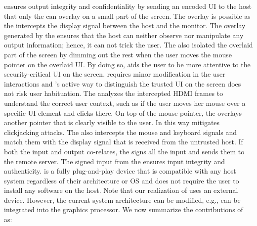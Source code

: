 \name ensures output integrity and confidentiality by sending an encoded UI to the host that only the \device can overlay on a small part of the screen. The overlay is possible as the \device intercepts the display signal between the host and the monitor. The overlay generated by the \device ensures that the host can neither observe nor manipulate any output information; hence, it can not trick the user. The \device also isolated the overlaid part of the screen by dimming out the rest when the user moves the mouse pointer on the overlaid UI. By doing so, \name aids the user to be more attentive to the security-critical UI on the screen. \name requires minor modification in the user interactions and \name's active way to distinguish the trusted UI on the screen does not risk user habituation. The \device analyzes the intercepted HDMI frames to understand the correct user context, such as if the user moves her mouse over a specific UI element and clicks there. On top of the mouse pointer, the \device overlays another pointer that is clearly visible to the user. In this way \name mitigates clickjacking attacks. The \device also intercepts the mouse and keyboard signals and match them with the display signal that is received from the untrusted host. If both the input and output co-relates, the \device signs all the input and sends them to the remote server. The signed input from the \device ensures input integrity and authenticity. \device is a fully plug-and-play device that is compatible with any host system regardless of their architecture or OS and does not require the user to install any software on the host. Note that our realization of \name uses an external device. However, the current system architecture can be modified, e.g., \device can be integrated into the graphics processor. We now summarize the contributions of \name as: 




